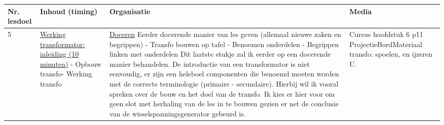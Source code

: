 \begin{landscape}
\begin{tabularx}{1.56\textwidth}{|p{1.5cm}|p{8cm}|X|p{4cm}|}
	\hline
	\textbf{Nr. lesdoel } & \textbf{Inhoud (timing)}  & \textbf{Organisatie } & \textbf{Media } \\ \hline
	5& \underline{Werking transformator:} \underline{inleiding (10 minuten)}\newline
	- Opbouw transfo\newline - Werking transfo
	&  \underline{Doceren}\newline 
	Eerder docerende manier van les geven (allemaal nieuwe zaken en begrippen) \newline
	- Transfo bouwen op tafel\newline
	- Benoemen onderdelen\newline
	- Begrippen linken met onderdelen
	Dit laatste stukje zal ik eerder op een docerende manier behandelen. De introductie van een transformator is niet eenvoudig, er zijn een heleboel componenten die benoemd moeten worden met de correcte terminologie (primaire - secundaire). Hierbij wil ik vooral spreken over de bouw en het doel van de transfo. Ik kies er hier voor om geen slot met herhaling van de les in te bouwen gezien er net de conclusie van de wisselspanningsgenerator gebeurd is. 	
	&  Cursus hoofdstuk 6 p11 \newline\newline Projectie\newline\newline Bord\newline\newline Materiaal transfo: spoelen, en ijzeren U.
	\\ \hline
\end{tabularx}\vspace{5mm}




	
\end{landscape}




